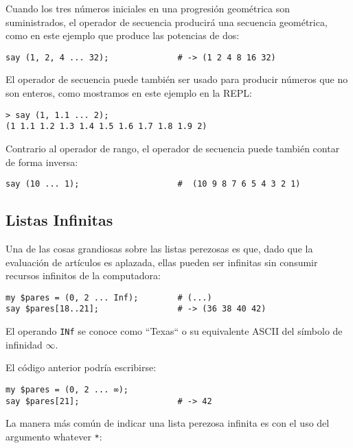 Cuando los tres números iniciales en una progresión geométrica son
suministrados, el operador de secuencia producirá una secuencia
geométrica, como en este ejemplo que produce las potencias de dos:

\begin{verbatim}
say (1, 2, 4 ... 32);              # -> (1 2 4 8 16 32)
\end{verbatim}

El operador de secuencia puede también ser usado para producir
números que no son enteros, como mostramos en este ejemplo en la REPL:

\begin{verbatim}
> say (1, 1.1 ... 2);
(1 1.1 1.2 1.3 1.4 1.5 1.6 1.7 1.8 1.9 2)
\end{verbatim}

Contrario al operador de rango, el operador de secuencia puede también 
contar de forma inversa:

\begin{verbatim}
say (10 ... 1);                    #  (10 9 8 7 6 5 4 3 2 1)
\end{verbatim}

\subsection{Listas Infinitas}

Una de las cosas grandiosas sobre las listas perezosas es que, 
dado que la evaluación de artículos es aplazada, ellas pueden ser
infinitas sin consumir recursos infinitos de la computadora:

\begin{verbatim}
my $pares = (0, 2 ... Inf);        # (...)
say $pares[18..21];                # -> (36 38 40 42)
\end{verbatim}

El operando {\tt INf} se conoce como ``Texas`` o su equivalente
ASCII del símbolo de infinidad $\infty$.

El código anterior podría escribirse:

\begin{verbatim}
my $pares = (0, 2 ... ∞); 
say $pares[21];                    # -> 42
\end{verbatim} 

La manera más común de indicar una lista perezosa infinita es con
el uso del argumento whatever \verb|*|:

